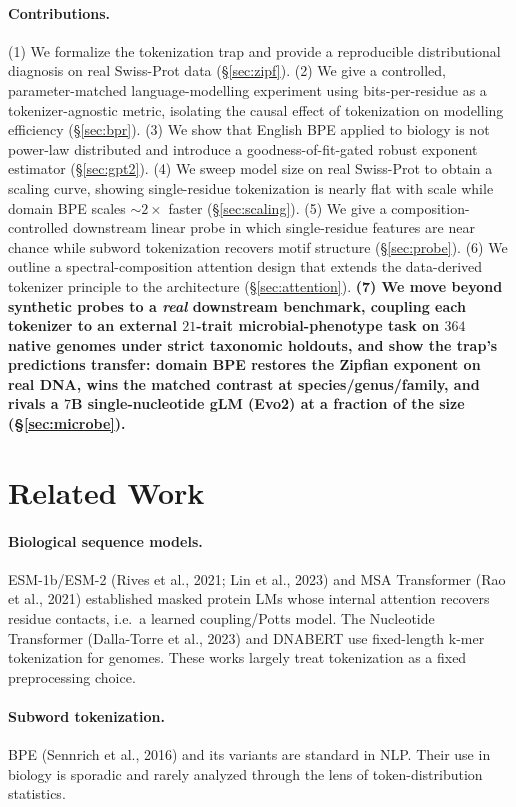 \documentclass[11pt]{article}
\begin{document}
\paragraph{Contributions.}
(1) We formalize the tokenization trap and provide a reproducible distributional
diagnosis on real Swiss-Prot data (\S\ref{sec:zipf}). (2) We give a controlled,
parameter-matched language-modelling experiment using bits-per-residue as a
tokenizer-agnostic metric, isolating the causal effect of tokenization on
modelling efficiency (\S\ref{sec:bpr}). (3) We show that English BPE applied to
biology is not power-law distributed and introduce a goodness-of-fit-gated
robust exponent estimator (\S\ref{sec:gpt2}). (4) We sweep model size on real
Swiss-Prot to obtain a scaling curve, showing single-residue tokenization is
nearly flat with scale while domain BPE scales ${\sim}2\times$ faster
(\S\ref{sec:scaling}). (5) We give a composition-controlled downstream linear
probe in which single-residue features are near chance while subword
tokenization recovers motif structure (\S\ref{sec:probe}). (6) We outline a
spectral-composition attention design that extends the data-derived tokenizer
principle to the architecture (\S\ref{sec:attention}). \textbf{(7) We move beyond
synthetic probes to a \emph{real} downstream benchmark, coupling each tokenizer
to an external $21$-trait microbial-phenotype task on $364$ native genomes under
strict taxonomic holdouts, and show the trap's predictions transfer: domain BPE
restores the Zipfian exponent on real DNA, wins the matched contrast at
species/genus/family, and rivals a $7$B single-nucleotide gLM (Evo2) at a
fraction of the size (\S\ref{sec:microbe}).}

\section{Related Work}
\paragraph{Biological sequence models.} ESM-1b/ESM-2 (Rives et al., 2021; Lin et
al., 2023) and MSA Transformer (Rao et al., 2021) established masked protein LMs
whose internal attention recovers residue contacts, i.e.\ a learned
coupling/Potts model. The Nucleotide Transformer (Dalla-Torre et al., 2023) and
DNABERT use fixed-length k-mer tokenization for genomes. These works largely
treat tokenization as a fixed preprocessing choice.

\paragraph{Subword tokenization.} BPE (Sennrich et al., 2016) and its variants
are standard in NLP. Their use in biology is sporadic and rarely analyzed
through the lens of token-distribution statistics.
\end{document}
